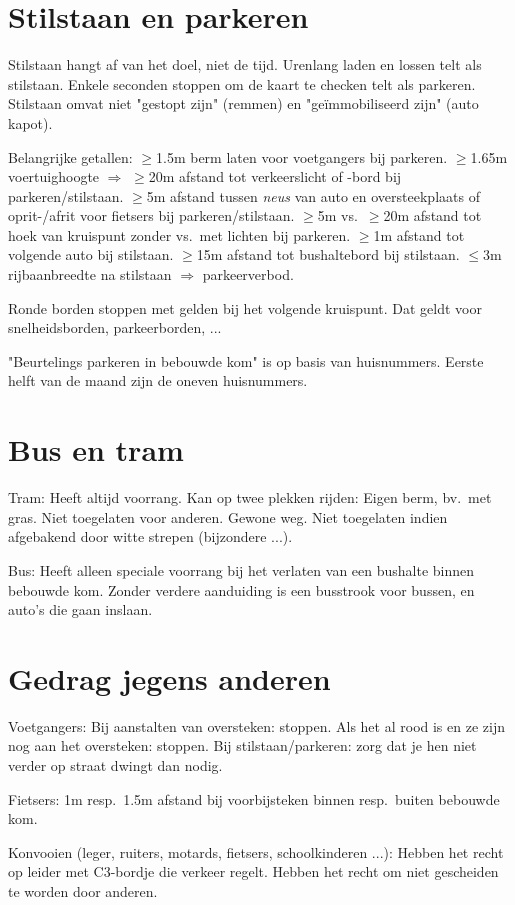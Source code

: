 \section{Stilstaan en parkeren}
\begin{outline}
\1 Stilstaan hangt af van het doel, niet de tijd.
	\2 Urenlang laden en lossen telt als stilstaan.
	\2 Enkele seconden stoppen om de kaart te checken telt als parkeren.
	\2 Stilstaan omvat niet "gestopt zijn" (remmen) en "geïmmobiliseerd zijn" (auto kapot).

\1 Belangrijke getallen:
	\2 $\geq$1.5m berm laten voor voetgangers bij parkeren.
	\2 $\geq$1.65m voertuighoogte $\Rightarrow$ $\geq$20m afstand tot verkeerslicht of -bord bij parkeren/stilstaan.
	\2 $\geq$5m afstand tussen \emph{neus} van auto en oversteekplaats of oprit-/afrit voor fietsers bij parkeren/stilstaan.
	\2 $\geq$5m vs.\ $\geq$20m afstand tot hoek van kruispunt zonder vs.\ met lichten bij parkeren.
	\2 $\geq$1m afstand tot volgende auto bij stilstaan.
	\2 $\geq$15m afstand tot bushaltebord bij stilstaan.
	\2 $\leq$3m rijbaanbreedte na stilstaan $\Rightarrow$ parkeerverbod.

\1 Ronde borden stoppen met gelden bij het volgende kruispunt.
	\2 Dat geldt voor snelheidsborden, parkeerborden, ...

\1 "Beurtelings parkeren in bebouwde kom" is op basis van huisnummers. Eerste helft van de maand zijn de oneven huisnummers.
\end{outline}

\section{Bus en tram}
\begin{outline}
\1 Tram:
	\2 Heeft altijd voorrang.
	\2 Kan op twee plekken rijden:
		\3 Eigen berm, bv.\ met gras. Niet toegelaten voor anderen.
		\3 Gewone weg. Niet toegelaten indien afgebakend door witte strepen (bijzondere ...).
	
\1 Bus:
	\2 Heeft alleen speciale voorrang bij het verlaten van een bushalte binnen bebouwde kom.
	\2 Zonder verdere aanduiding is een busstrook voor bussen, en auto's die gaan inslaan.
\end{outline}

\section{Gedrag jegens anderen}
\begin{outline}
\1 Voetgangers: 
	\2 Bij aanstalten van oversteken: stoppen.
	\2 Als het al rood is en ze zijn nog aan het oversteken: stoppen.
	\2 Bij stilstaan/parkeren: zorg dat je hen niet verder op straat dwingt dan nodig.
	
\1 Fietsers:
	\2 1m resp.\ 1.5m afstand bij voorbijsteken binnen resp.\ buiten bebouwde kom.

\1 Konvooien (leger, ruiters, motards, fietsers, schoolkinderen ...):
	\2 Hebben het recht op leider met C3-bordje die verkeer regelt.
	\2 Hebben het recht om niet gescheiden te worden door anderen.
\end{outline}

